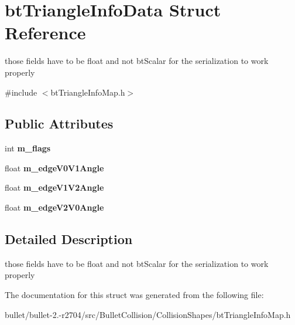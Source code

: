 \hypertarget{structbt_triangle_info_data}{\section{bt\+Triangle\+Info\+Data Struct Reference}
\label{structbt_triangle_info_data}
}


those fields have to be float and not bt\+Scalar for the serialization to work properly  




{\ttfamily \#include $<$bt\+Triangle\+Info\+Map.\+h$>$}

\subsection*{Public Attributes}
\begin{DoxyCompactItemize}
\item 
\hypertarget{structbt_triangle_info_data_a7bfe20013f2997922e04767055b3fe6a}{int {\bfseries m\+\_\+flags}}\label{structbt_triangle_info_data_a7bfe20013f2997922e04767055b3fe6a}

\item 
\hypertarget{structbt_triangle_info_data_a1cc8fe53a7be04e8020739dc8debd9b1}{float {\bfseries m\+\_\+edge\+V0\+V1\+Angle}}\label{structbt_triangle_info_data_a1cc8fe53a7be04e8020739dc8debd9b1}

\item 
\hypertarget{structbt_triangle_info_data_a12ce66d0be1997d05680f9e4625b6796}{float {\bfseries m\+\_\+edge\+V1\+V2\+Angle}}\label{structbt_triangle_info_data_a12ce66d0be1997d05680f9e4625b6796}

\item 
\hypertarget{structbt_triangle_info_data_a54743fbdba0d972e9ab16f756236659f}{float {\bfseries m\+\_\+edge\+V2\+V0\+Angle}}\label{structbt_triangle_info_data_a54743fbdba0d972e9ab16f756236659f}

\end{DoxyCompactItemize}


\subsection{Detailed Description}
those fields have to be float and not bt\+Scalar for the serialization to work properly 

The documentation for this struct was generated from the following file\+:\begin{DoxyCompactItemize}
\item 
bullet/bullet-\/2.-\/r2704/src/\+Bullet\+Collision/\+Collision\+Shapes/bt\+Triangle\+Info\+Map.\+h\end{DoxyCompactItemize}
